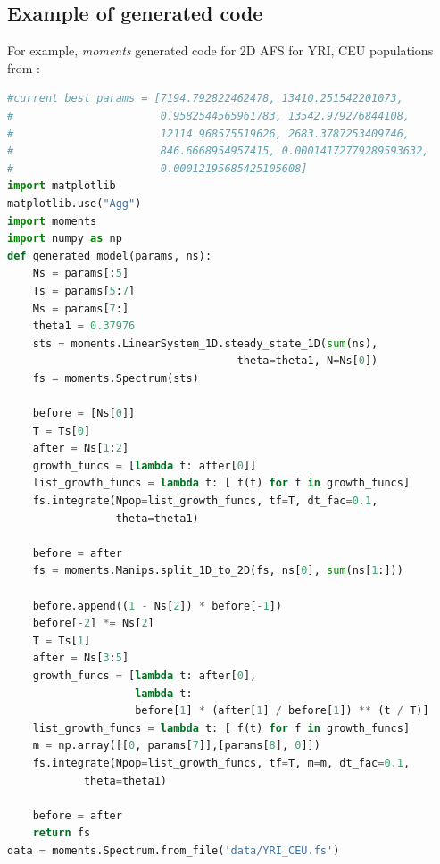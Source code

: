 \documentclass[12pt]{article}
\newcommand{\moments}{\textit{moments}\xspace}
\begin{document}
\begin{appendices}
\newpage
\section{Example of generated code}
\label{sec:ex-gen-code}
For example, \moments generated code for 2D AFS for YRI, CEU populations from \cite{gutenkunst2009}:

\begin{lstlisting}[language=Python]
#current best params = [7194.792822462478, 13410.251542201073, 
#                       0.9582544565961783, 13542.979276844108, 
#                       12114.968575519626, 2683.3787253409746, 
#                       846.6668954957415, 0.00014172779289593632, 
#                       0.00012195685425105608]
import matplotlib
matplotlib.use("Agg")
import moments
import numpy as np
def generated_model(params, ns):
	Ns = params[:5]
	Ts = params[5:7]
	Ms = params[7:]
	theta1 = 0.37976
	sts = moments.LinearSystem_1D.steady_state_1D(sum(ns), 
	                                theta=theta1, N=Ns[0])
	fs = moments.Spectrum(sts)

	before = [Ns[0]]
	T = Ts[0]
	after = Ns[1:2]
	growth_funcs = [lambda t: after[0]]
	list_growth_funcs = lambda t: [ f(t) for f in growth_funcs]
	fs.integrate(Npop=list_growth_funcs, tf=T, dt_fac=0.1, 
	             theta=theta1)

	before = after
	fs = moments.Manips.split_1D_to_2D(fs, ns[0], sum(ns[1:]))

	before.append((1 - Ns[2]) * before[-1])
	before[-2] *= Ns[2]
	T = Ts[1]
	after = Ns[3:5]
	growth_funcs = [lambda t: after[0], 
	                lambda t: 
	                before[1] * (after[1] / before[1]) ** (t / T)]
	list_growth_funcs = lambda t: [ f(t) for f in growth_funcs]
	m = np.array([[0, params[7]],[params[8], 0]])
	fs.integrate(Npop=list_growth_funcs, tf=T, m=m, dt_fac=0.1,
	        theta=theta1)

	before = after
	return fs
data = moments.Spectrum.from_file('data/YRI_CEU.fs')



\end{lstlisting}
\end{appendices}
\end{document}
